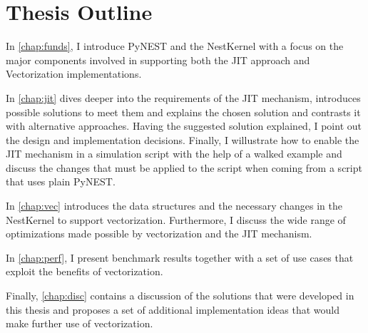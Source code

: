 \section{Thesis Outline}

In \autoref{chap:funds}, I introduce PyNEST and the NestKernel with a focus on the major components involved in supporting both the JIT approach and Vectorization implementations.

In \autoref{chap:jit} dives deeper into the requirements of the JIT mechanism, introduces possible solutions to meet them and explains the chosen solution and contrasts it with alternative approaches. Having the suggested solution explained, I point out the design and implementation decisions. Finally, I willustrate how to enable the JIT mechanism in a simulation script with the help of a walked example and discuss the changes that must be applied to the script when coming from a script that uses plain PyNEST.

In \autoref{chap:vec} introduces the data structures and the necessary changes in the NestKernel to support vectorization. Furthermore, I discuss the wide range of optimizations made possible by vectorization and the JIT mechanism.

In \autoref{chap:perf}, I present benchmark results together with a set of use cases that exploit the benefits of vectorization.

Finally, \autoref{chap:disc} contains a discussion of the solutions that were developed in this thesis and proposes a set of additional implementation ideas that would make further use of vectorization.

\cleardoublepage
